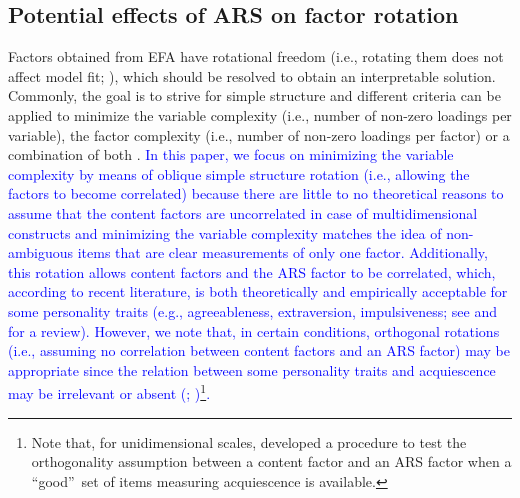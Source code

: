 \documentclass[a4paper,man,natbib]{apa6}
\begin{document}
\begin{linenumbers}
\subsection{Potential effects of ARS on factor rotation}
Factors obtained from EFA have rotational freedom (i.e., rotating them does not affect model fit; \citealp{browne2001overview}), which should be resolved to obtain an interpretable solution.
Commonly, the goal is to strive for simple structure and different criteria can be applied to minimize the variable complexity (i.e., number of non-zero loadings per variable), the factor complexity (i.e., number of non-zero loadings per factor) or a combination of both \citep{schmitt2011rotation}. \label{refpage:R2Mj3a}\textcolor{blue}{In this paper, we focus on minimizing the variable complexity by means of oblique simple structure rotation (i.e., allowing the factors to become correlated) because there are little to no theoretical reasons to assume that the content factors are uncorrelated in case of multidimensional constructs and minimizing the variable complexity matches the idea of non-ambiguous items that are clear measurements of only one factor. Additionally, this rotation allows content factors and the ARS factor to be correlated, which, according to recent literature, is both theoretically and empirically acceptable for some personality traits (e.g., agreeableness, extraversion, impulsiveness; see \citealp{ferrando2016assessing} and \citealp{weijters2010individual} for a review). However, we note that, in certain conditions, orthogonal rotations (i.e., assuming no correlation between content factors and an ARS factor) may be appropriate since the relation between some personality traits and acquiescence may be irrelevant or absent (\citealp{messick1958ability}; \citealp{mccrae1983social})\footnote{Note that, for unidimensional scales, \citet{ferrando2016assessing} developed a procedure to test the orthogonality assumption between a content factor and an ARS factor when a \textquotedblleft good\textquotedblright\, set of items measuring acquiescence is available.}.}




\end{linenumbers}
\end{document}
